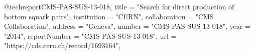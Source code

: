 @techreport{CMS-PAS-SUS-13-018,
      title         = "{Search for direct production of bottom squark pairs}",
      institution   = "CERN",
      collaboration = "CMS Collaboration",
      address       = "Geneva",
      number        = "CMS-PAS-SUS-13-018",
      year          = "2014",
      reportNumber  = "CMS-PAS-SUS-13-018",
      url           = "https://cds.cern.ch/record/1693164",
}

